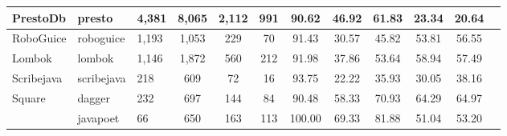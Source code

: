 \begin{table}
{\begin{tabular}{lllccccccccc}
PrestoDb                    & presto                                                        & 4,381           & 8,065            & 2,112                                                            & 991            & 90.62          & 46.92          & 61.83          & 23.34                                                             & 20.64                                                              \\ \hline
RoboGuice                   & roboguice                                                     & 1,193           & 1,053            & 229                                                              & 70             & 91.43          & 30.57          & 45.82          & 53.81                                                             & 56.55                                                              \\ \hline
Lombok                      & lombok                                                        & 1,146           & 1,872            & 560                                                              & 212            & 91.98          & 37.86          & 53.64          & 58.94                                                             & 57.49                                                              \\ \hline
Scribejava                  & scribejava                                                    & 218             & 609              & 72                                                               & 16             & 93.75          & 22.22          & 35.93          & 30.05                                                             & 38.16                                                              \\ \hline
\multirow{6}{*}{Square}     & dagger                                                        & 232             & 697              & 144                                                              & 84             & 90.48          & 58.33          & 70.93          & 64.29                                                             & 64.97                                                              \\
                            & javapoet                                                      & 66              & 650              & 163                                                              & 113            & 100.00         & 69.33          & 81.88          & 51.04                                                             & 53.20                                                              \\

\end{tabular}}
\end{table}
